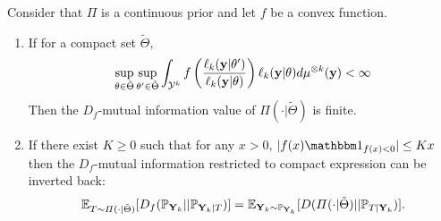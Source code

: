 \begin{prop}[Invertibility]\label{prop:PS:invertibility}
    Consider that $\varPi$ is a continuous prior and let $f$ be a convex function. %
    \begin{enumerate}
        \item If for a compact set $\tilde\Theta$,
        \begin{equation}
            \sup_{\theta\in\tilde\Theta}\sup_{\theta'\in\tilde\Theta} \int_{\mathcal{Y}^k} f\left(\frac{\ell_k(\mathbf{y}|\theta')}{\ell_k(\mathbf{y}|\theta)}  \right) \ell_k(\mathbf{y}|\theta) d\mu^{\otimes k}(\mathbf{y})<\infty
        \end{equation}
    Then the $D_f$-mutual information value of $\varPi(\cdot|\tilde\Theta)$ is finite. %
        \item
    If there exist $K\geq0$ such that for any $x>0$, $|f(x)\indic_{f(x)<0}|\leq Kx $ then the $D_f$-mutual information restricted to compact expression can be inverted back:
        \begin{equation}\label{eq:PS:fubDf}
            \mathbb{E}_{T\sim\varPi(\cdot|\tilde\Theta)}[D_f(\mathbb{P}_{\mathbf{Y}_k}||\mathbb{P}_{\mathbf{Y}_k|T})] 
                =\mathbb{E}_{\mathbf{Y}_k\sim\mathbb{P}_{\mathbf{Y}_k}} [D(\varPi(\cdot|\tilde\Theta)|| \mathbb{P}_{T|\mathbf{Y}_k} ) ]. 
        \end{equation}
    \end{enumerate}
\end{prop}

